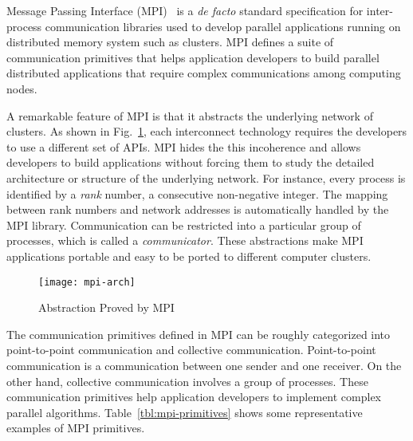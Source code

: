 Message Passing Interface (MPI)~\autocite{MPIForum2012} is a \emph{de
facto} standard specification for inter-process communication libraries
used to develop parallel applications running on distributed memory system
such as clusters. MPI defines a suite of communication primitives that helps
application developers to build parallel distributed applications that require
complex communications among computing nodes.

A remarkable feature of MPI is that it abstracts the underlying network
of clusters. As shown in Fig.~\ref{fig:mpi-arch}, each interconnect technology
requires the developers to use a different set of APIs. MPI hides the this
incoherence and allows developers to build applications without forcing them
to study the detailed architecture or structure of the underlying network. For
instance, every process is identified by a \emph{rank} number, a consecutive
non-negative integer. The mapping between rank numbers and network addresses
is automatically handled by the MPI library. Communication can be restricted
into a particular group of processes, which is called a \emph{communicator}.
These abstractions make MPI applications portable and easy to be ported to
different computer clusters.

\begin{figure}
    \centering
    \texttt{[image: mpi-arch]}
    \caption{Abstraction Proved by MPI}%
    \label{fig:mpi-arch}
\end{figure}

The communication primitives defined in MPI can be roughly categorized into
point-to-point communication and collective communication. Point-to-point
communication is a communication between one sender and one receiver. On the
other hand, collective communication involves a group of processes. These
communication primitives help application developers to implement complex
parallel algorithms. Table~\ref{tbl:mpi-primitives} shows some representative
examples of MPI primitives.

